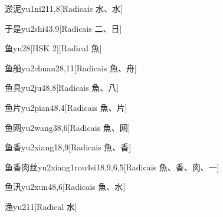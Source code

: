 \begin{entry}{淤泥}{yu1ni2}{11,8}[Radicais ⽔、⽔]
\end{entry}

\begin{entry}{于是}{yu2shi4}{3,9}[Radicais ⼆、⽇]
\end{entry}

\begin{entry}{鱼}{yu2}{8}[HSK 2][Radical ⿂]
\end{entry}

\begin{entry}{鱼船}{yu2chuan2}{8,11}[Radicais ⿂、⾈]
\end{entry}

\begin{entry}{鱼具}{yu2ju4}{8,8}[Radicais ⿂、⼋]
\end{entry}

\begin{entry}{鱼片}{yu2pian4}{8,4}[Radicais ⿂、⽚]
\end{entry}

\begin{entry}{鱼网}{yu2wang3}{8,6}[Radicais ⿂、⽹]
\end{entry}

\begin{entry}{鱼香}{yu2xiang1}{8,9}[Radicais ⿂、⾹]
\end{entry}

\begin{entry}{鱼香肉丝}{yu2xiang1rou4si1}{8,9,6,5}[Radicais ⿂、⾹、⾁、⼀]
\end{entry}

\begin{entry}{鱼汛}{yu2xun4}{8,6}[Radicais ⿂、⽔]
\end{entry}

\begin{entry}{渔}{yu2}{11}[Radical ⽔]
\end{entry}


